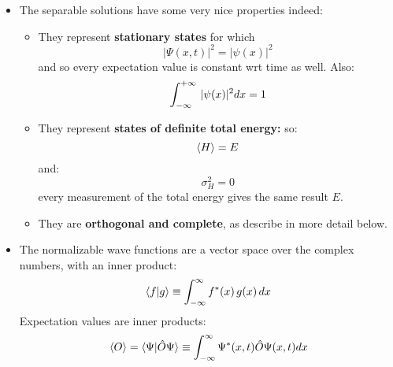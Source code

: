 \documentclass[12pt]{book}
\begin{document}
\begin{itemize}
\item The separable solutions have some very nice properties indeed:
\begin{itemize}
\item They represent {\bf stationary states} for which
$$|\Psi(x,t)|^2 = | \psi(x) |^2$$
and so every expectation value is constant wrt time as well.  Also:
\begin{equation*}
\int_{-\infty}^{+\infty}\, |\psi(x)|^2 dx = 1\\
\end{equation*}
\item They represent {\bf states of definite total energy:} so:
$$\braket{H} = E$$
and:
$$\sigma^2_H = 0$$
every measurement of the total energy gives the same result $E$.
\item They are {\bf orthogonal and complete}, as describe in more detail below.
\end{itemize}

\item The normalizable wave functions are a vector space over the complex numbers, with an inner product:
\begin{equation}
\braket{f|g} \equiv \int_{-\infty}^{\infty} f^*(x) \, g(x) \, dx
\end{equation}
Expectation values are inner products:
\begin{equation}
\braket{O} = \braket{\Psi|\hat{O}\Psi} \equiv \int_{-\infty}^{\infty} \Psi^*(x,t)\hat{O}\Psi(x,t) dx
\end{equation}


\end{itemize}
\end{document}
